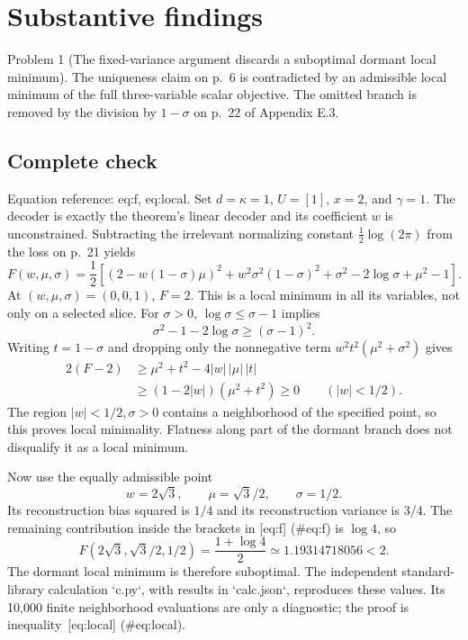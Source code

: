 \documentclass[10pt]{article}
\begin{document}
\section*{Substantive findings}
Problem 1 (The fixed-variance argument discards a suboptimal dormant local minimum).  The uniqueness claim on p. 6 is contradicted by an admissible local minimum of the full three-variable scalar objective. The omitted branch is removed by the division by \(1-\sigma\) on p. 22 of Appendix E.3.\par
\subsection*{Complete check}
Equation reference: eq:f, eq:local. Set \(d=\kappa=1\), \(U=[1]\), \(x=2\), and \(\gamma=1\). The decoder is exactly the theorem’s linear decoder and its coefficient \(w\) is unconstrained. Subtracting the irrelevant normalizing constant \(\tfrac12\log(2\pi)\) from the loss on p. 21 yields \[
F(w,\mu,\sigma)=\frac12\left[
 (2-w(1-\sigma)\mu)^2+w^2\sigma^2(1-\sigma)^2
 +\sigma^2-2\log\sigma+\mu^2-1\right].\] At \((w,\mu,\sigma)=(0,0,1)\), \(F=2\). This is a local minimum in all its variables, not only on a selected slice. For \(\sigma>0\), \(\log\sigma\leq \sigma-1\) implies \[\sigma^2-1-2\log\sigma\geq(\sigma-1)^2.\] Writing \(t=1-\sigma\) and dropping only the nonnegative term \(w^2t^2(\mu^2+\sigma^2)\) gives \[\begin{aligned}
2(F-2)&\geq \mu^2+t^2-4|w|\,|\mu|\,|t|\\
&\geq(1-2|w|)(\mu^2+t^2)\geq0
       \qquad (|w|<1/2).\end{aligned}\] The region \(|w|<1/2,\sigma>0\) contains a neighborhood of the specified point, so this proves local minimality. Flatness along part of the dormant branch does not disqualify it as a local minimum.\par
Now use the equally admissible point \[w=2\sqrt3,\qquad \mu=\sqrt3/2,\qquad \sigma=1/2.\] Its reconstruction bias squared is \(1/4\) and its reconstruction variance is \(3/4\). The remaining contribution inside the brackets in [eq:f] (\#eq:f) is \(\log4\), so \[F(2\sqrt3,\sqrt3/2,1/2)=\frac{1+\log4}{2}
 \simeq1.19314718056<2.\] The dormant local minimum is therefore suboptimal. The independent standard-library calculation `c.py`, with results in `calc.json`, reproduces these values. Its 10,000 finite neighborhood evaluations are only a diagnostic; the proof is inequality [eq:local] (\#eq:local).\par
\end{document}
